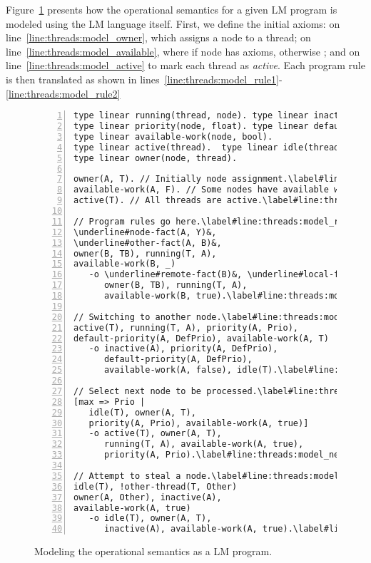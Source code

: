 Figure~\ref{code:threads:modeling} presents how the operational semantics for a
given LM program is modeled using the LM language itself. First, we define the
initial axioms:  on line~\ref{line:threads:model_owner}, which
assigns a node to a thread;  on
line~\ref{line:threads:model_available}, where  if node 
has axioms, otherwise ; and  on
line~\ref{line:threads:model_active} to mark each thread as \emph{active}.
Each program rule is then translated as shown in
lines~\ref{line:threads:model_rule1}-\ref{line:threads:model_rule2}

\begin{figure}[h!]
\begin{Verbatim}[numbers=left,fontsize=\codesize,commandchars=\\\#\&]
type linear running(thread, node). type linear inactive(node).
type linear priority(node, float). type linear default-priority(node, float).
type linear available-work(node, bool).
type linear active(thread).  type linear idle(thread).
type linear owner(node, thread).

owner(A, T). // Initially node assignment.\label#line:threads:model_owner&
available-work(A, F). // Some nodes have available work.\label#line:threads:model_available&
active(T). // All threads are active.\label#line:threads:model_active&

// Program rules go here.\label#line:threads:model_rule1&
\underline#node-fact(A, Y)&,
\underline#other-fact(A, B)&,
owner(B, TB), running(T, A),
available-work(B, _)
   -o \underline#remote-fact(B)&, \underline#local-fact(A)&,
      owner(B, TB), running(T, A),
      available-work(B, true).\label#line:threads:model_rule2&

// Switching to another node.\label#line:threads:model_drop_node1&
active(T), running(T, A), priority(A, Prio),
default-priority(A, DefPrio), available-work(A, T)
   -o inactive(A), priority(A, DefPrio),
      default-priority(A, DefPrio),
      available-work(A, false), idle(T).\label#line:threads:model_drop_node2&

// Select next node to be processed.\label#line:threads:model_next_node1&
[max => Prio |
   idle(T), owner(A, T),
   priority(A, Prio), available-work(A, true)]
   -o active(T), owner(A, T),
      running(T, A), available-work(A, true),
      priority(A, Prio).\label#line:threads:model_next_node2&

// Attempt to steal a node.\label#line:threads:model_steal1&
idle(T), !other-thread(T, Other)
owner(A, Other), inactive(A),
available-work(A, true)
   -o idle(T), owner(A, T),
      inactive(A), available-work(A, true).\label#line:threads:model_steal2&
\end{Verbatim}
\caption{Modeling the operational semantics as a LM program.}
\label{code:threads:modeling}
\end{figure}


